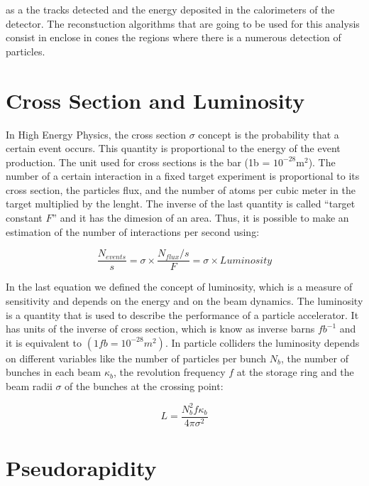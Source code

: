  as a the tracks detected and the energy deposited in the calorimeters of the detector. The 
 reconstuction algorithms that are going to be used for this analysis consist in enclose in cones the regions where there is a numerous detection of particles. 
 
 \section{Cross Section and Luminosity}
 
 In High Energy Physics, the cross section $\sigma$ concept is the probability that a certain event  occurs. This quantity is proportional to the energy of the event production. The unit 
 used for cross sections is the bar (1b = $10^{-28} \text{m}^2$). The number of a certain interaction in a fixed target experiment is proportional to its cross section, the particles flux, and the
 number of atoms per cubic meter in the target multiplied by the lenght. The inverse of the last quantity is called ``target constant $F$'' and it has the dimesion of an area. Thus, it is possible
 to make an estimation of the number of interactions per second using:
 
 \begin{equation}
  \frac{N_{events}}{s} = \sigma \times \frac{N_{flux}/s}{F} = \sigma \times Luminosity
 \end{equation}

 In the last equation we defined the concept of luminosity, which is a measure of sensitivity and depends on the energy and on the beam dynamics.  The luminosity is a quantity that is used to 
 describe the performance of a particle accelerator. It has units of the inverse of cross section, which is know as inverse barns $fb^{-1}$ and it is equivalent to $(1 fb = 10^{-28} m^2)$. 
 In particle colliders the 
 luminosity depends on different variables like the number of particles per bunch $N_b$, the number of bunches in each beam $\kappa_b$, the revolution frequency $f$ at the storage ring and the beam radii 
 $ \sigma$ of the bunches at the crossing point:
 
 \begin{equation}
  L = \frac{N_b^2 f \kappa_b}{4\pi \sigma^2} 
 \end{equation}

 \section{Pseudorapidity}
 
